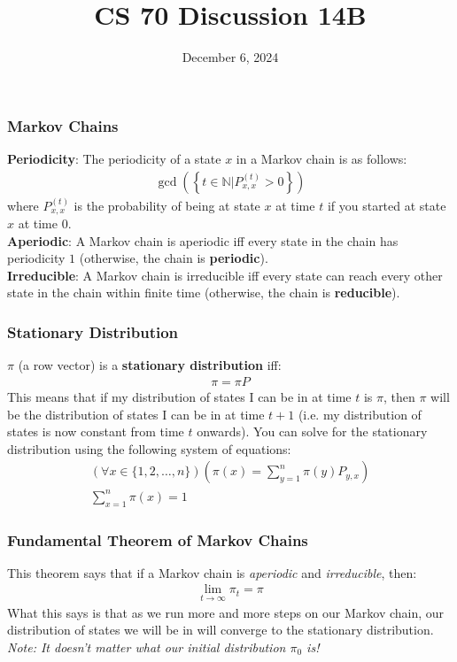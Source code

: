 \documentclass{beamer}
\title{CS 70 Discussion 14B}
\date{December 6, 2024}
\begin{document}
\frame{\titlepage}

\begin{frame}
    \frametitle{Markov Chains}
    {\bf Periodicity}: The periodicity of a state $x$ in a Markov chain is as follows:
    \begin{align*}
        \gcd\left(\left\{t\in\mathbb{N}|P_{x,x}^{(t)}>0\right\}\right)
    \end{align*}
    where $P_{x,x}^{(t)}$ is the probability of being at state $x$ at time $t$ if you started at state $x$ at time $0$.\\
    {\bf Aperiodic}: A Markov chain is aperiodic iff every state in the chain has periodicity $1$ (otherwise, the chain is {\bf periodic}).\\
    {\bf Irreducible}: A Markov chain is irreducible iff every state can reach every other state in the chain within finite time (otherwise, the chain is {\bf reducible}).
\end{frame}

\begin{frame}
    \frametitle{Stationary Distribution}
    $\pi$ (a row vector) is a {\bf stationary distribution} iff: \begin{align*}
        \pi=\pi P
    \end{align*}
    This means that if my distribution of states I can be in at time $t$ is $\pi$, then $\pi$ will be the distribution of states I can be in at time $t+1$ (i.e. my distribution of states is now constant from time $t$ onwards). You can solve for the stationary distribution using the following system of equations:
    \begin{gather*}
        (\forall x\in\{1,2,\dots,n\})\left(\pi(x)=\sum_{y=1}^n\pi(y)P_{y,x}\right)\\
        \sum_{x=1}^n\pi(x)=1
    \end{gather*}
\end{frame}

\begin{frame}
    \frametitle{Fundamental Theorem of Markov Chains}
    This theorem says that if a Markov chain is {\it aperiodic} and {\it irreducible}, then:
    \begin{align*}
        \lim_{t\rightarrow\infty}\pi_t=\pi
    \end{align*}
    What this says is that as we run more and more steps on our Markov chain, our distribution of states we will be in will converge to the stationary distribution.\\
    {\it Note: It doesn't matter what our initial distribution $\pi_0$ is!} 
\end{frame}
\end{document}
